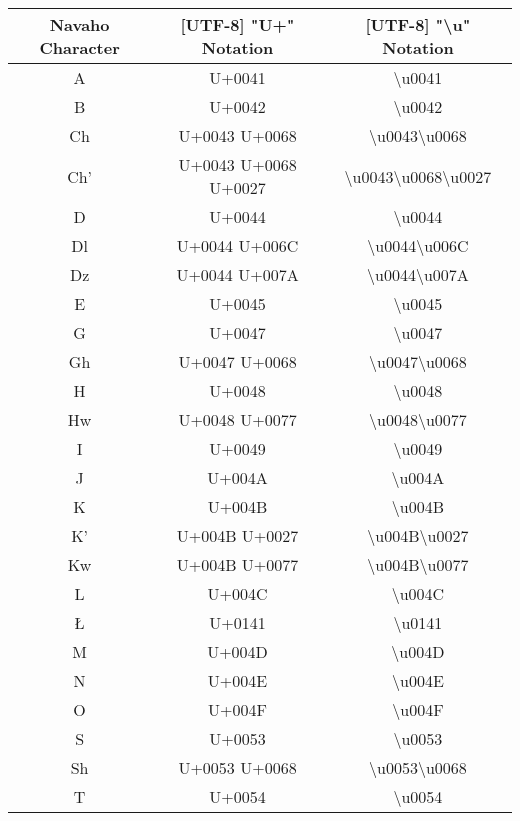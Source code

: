 \begin{longtable}{|c|c|c|}
\hline
\textbf{Navaho Character} & \textbf{[UTF-8] "U+" Notation} & \textbf{[UTF-8] "\textbackslash{}u" Notation} \\
\hline
A & U+0041 & \textbackslash{}u0041 \\ \hline
B & U+0042 & \textbackslash{}u0042 \\ \hline
Ch & U+0043 U+0068 & \textbackslash{}u0043\textbackslash{}u0068 \\ \hline
Ch' & U+0043 U+0068 U+0027 & \textbackslash{}u0043\textbackslash{}u0068\textbackslash{}u0027 \\ \hline
D & U+0044 & \textbackslash{}u0044 \\ \hline
Dl & U+0044 U+006C & \textbackslash{}u0044\textbackslash{}u006C \\ \hline
Dz & U+0044 U+007A & \textbackslash{}u0044\textbackslash{}u007A \\ \hline
E & U+0045 & \textbackslash{}u0045 \\ \hline
G & U+0047 & \textbackslash{}u0047 \\ \hline
Gh & U+0047 U+0068 & \textbackslash{}u0047\textbackslash{}u0068 \\ \hline
H & U+0048 & \textbackslash{}u0048 \\ \hline
Hw & U+0048 U+0077 & \textbackslash{}u0048\textbackslash{}u0077 \\ \hline
I & U+0049 & \textbackslash{}u0049 \\ \hline
J & U+004A & \textbackslash{}u004A \\ \hline
K & U+004B & \textbackslash{}u004B \\ \hline
K' & U+004B U+0027 & \textbackslash{}u004B\textbackslash{}u0027 \\ \hline
Kw & U+004B U+0077 & \textbackslash{}u004B\textbackslash{}u0077 \\ \hline
L & U+004C & \textbackslash{}u004C \\ \hline
Ł & U+0141 & \textbackslash{}u0141 \\ \hline
M & U+004D & \textbackslash{}u004D \\ \hline
N & U+004E & \textbackslash{}u004E \\ \hline
O & U+004F & \textbackslash{}u004F \\ \hline
S & U+0053 & \textbackslash{}u0053 \\ \hline
Sh & U+0053 U+0068 & \textbackslash{}u0053\textbackslash{}u0068 \\ \hline
T & U+0054 & \textbackslash{}u0054 \\ \hline

\end{longtable}
